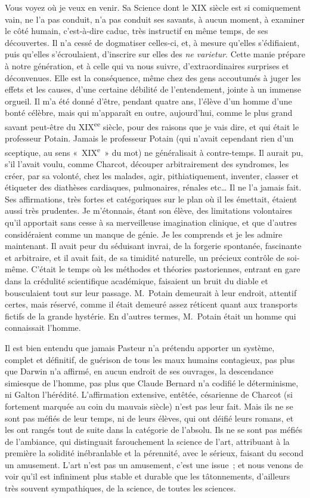 \documentclass[french,twoside]{book} %
\begin{document}
Vous voyez où je veux en venir. Sa Science dont le XIX siècle est si comiquement vain, ne l’a pas conduit, n’a pas conduit ses savants, à aucun moment, à examiner le côté humain, c’est-à-dire caduc, très instructif en même temps, de ses découvertes. Il n’a cessé de dogmatiser celles-ci, et, à mesure qu’elles s’édifiaient, puis qu’elles s’écroulaient, d’inscrire sur elles des {\itshape ne varietur}. Cette manie prépare à notre génération, et à celle qui va nous suivre, d’extraordinaires surprises et déconvenues. Elle est la conséquence, même chez des gens accoutumés à juger les effets et les causes, d’une certaine débilité de l’entendement, jointe à un immense orgueil. Il m’a été donné d’être, pendant quatre ans, l’élève d’un homme d’une bonté célèbre, mais qui m’apparaît en outre, aujourd’hui, comme le plus grand savant peut-être du XIX\textsuperscript{ee} siècle, pour des raisons que je vais dire, et qui était le professeur Potain. Jamais le professeur Potain (qui n’avait cependant rien d’un sceptique, au sens « XIX\textsuperscript{e} » du mot) ne généralisait à contre-temps. Il aurait pu, s’il l’avait voulu, comme Charcot, découper arbitrairement des syndromes, les créer, par sa volonté, chez les malades, agir, pithiatiquement, inventer, classer et étiqueter des diathèses cardiaques, pulmonaires, rénales etc… Il ne l’a jamais fait. Ses affirmations, très fortes et catégoriques sur le plan où il les émettait, étaient aussi très prudentes. Je m’étonnais, étant son élève, des limitations volontaires qu’il apportait sans cesse à sa merveilleuse imagination clinique, et que d’autres considéraient comme un manque de génie. Je les comprends et je les admire maintenant. Il avait peur du séduisant invrai, de la forgerie spontanée, fascinante et arbitraire, et il avait fait, de sa timidité naturelle, un précieux contrôle de soi-même. C’était le temps où les méthodes et théories pastoriennes, entrant en gare dans la crédulité scientifique académique, faisaient un bruit du diable et bousculaient tout sur leur passage. M. Potain demeurait à leur endroit, attentif certes, mais réservé, comme il était demeuré assez réticent quant aux transports fictifs de la grande hystérie. En d’autres termes, M. Potain était un homme qui connaissait l’homme.\par
Il est bien entendu que jamais Pasteur n’a prétendu apporter un système, complet et définitif, de guérison de tous les maux humains contagieux, pas plus que Darwin n’a affirmé, en aucun endroit de ses ouvrages, la descendance simiesque de l’homme, pas plus que Claude Bernard n’a codifié le déterminisme, ni Galton l’hérédité. L’affirmation extensive, entêtée, césarienne de Charcot (si fortement marquée au coin du mauvais siècle) n’est pas leur fait. Mais ils ne se sont pas méfiés de leur temps, ni de leurs élèves, qui ont déifié leurs romans, et les ont rangés tout de suite dans la catégorie de l’absolu. Ils ne se sont pas méfiés de l’ambiance, qui distinguait farouchement la science de l’art, attribuant à la première la solidité inébranlable et la pérennité, avec le sérieux, faisant du second un amusement. L’art n’est pas un amusement, c’est une issue ; et nous venons de voir qu’il est infiniment plus stable et durable que les tâtonnements, d’ailleurs très souvent sympathiques, de la science, de toutes les sciences.\par
\end{document}
